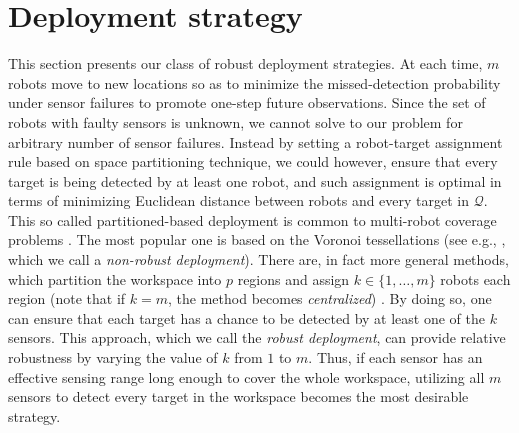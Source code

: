 \documentclass[letterpaper, 10 pt, conference]{ieeeconf}
\newcommand{\Ram}[1]{{\normalsize{\textbf{({\color{green}Ram:\ }#1)}}}}
\begin{document}
\section{Deployment strategy}
\label{sec:sec4}
This section presents our class of robust deployment strategies.
At each time, $m$ robots move to new locations so as to minimize the missed-detection probability under sensor failures to promote one-step future observations. Since the set of robots with faulty sensors is unknown, we cannot solve to our problem for arbitrary number of sensor failures. Instead by setting a robot-target assignment rule based on space partitioning technique, we could however, ensure that every target is being detected by at least one robot, and such assignment is optimal in terms of minimizing Euclidean distance between robots and every target in $\mathcal{Q}$. 
This so called partitioned-based deployment is common to multi-robot coverage problems \cite{cortes_coverage_2004,hutchinson_robust_2012,schwager2009decentralized,park2014robust}. 
The most popular one is based on the Voronoi tessellations (see e.g., \cite{cortes_coverage_2004}, which we call a \emph{non-robust deployment}).
There are, in fact more general methods, which partition the workspace into $p$ regions and assign $k \in \lbrace 1,\dots,m \rbrace$ robots each region (note that if $k=m$, the method becomes \emph{centralized}) \cite{hutchinson_robust_2012}. 
By doing so, one can ensure that each target has a chance to be detected by at least one of the $k$ sensors.
This approach, which we call the \emph{robust deployment}, can provide relative robustness by varying the value of $k$ from $1$ to $m$.
Thus, if each sensor has an effective sensing range long enough to cover the whole workspace, utilizing all $m$ sensors to detect every target in the workspace becomes the most desirable strategy.

\end{document}
